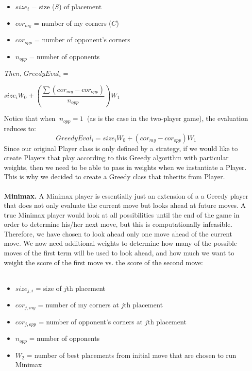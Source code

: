 \documentclass[11pt]{article}
\begin{document}
\begin{itemize}
\item $ size_i $ = size ($S$) of placement
\item $ cor_{my} $ = number of my corners ($C$)
\item $ cor_{opp} $ = number of opponent's corners
\item $ n_{opp} $ = number of opponents
\end{itemize}

{\it Then,} $ GreedyEval_i = $

\begin{center} $ size_i W_0 + \left ( \dfrac{\sum{(cor_{my} - cor_{opp})}}{n_{opp}} \right ) W_1 $ \end{center}

\bigskip

\noindent Notice that when $\ n_{opp} = 1 \ $ (as is the case in the two-player game), the evaluation reduces to:
$$ GreedyEval_i = size_i W_0 + (cor_{my} - cor_{opp}) W_1 $$
\noindent Since our original Player class is only defined by a strategy, if we would like to create Players that play according to this Greedy algorithm with particular weights, then we need to be able to pass in weights when we instantiate a Player. This is why we decided to create a Greedy class that inherits from Player.
\\\\
{\bf Minimax.} A Minimax player is essentially just an extension of a a Greedy player that does not only evaluate the current move but looks ahead at future moves. A true Minimax player would look at all possibilities until the end of the game in order to determine his/her next move, but this is computationally infeasible. Therefore, we have chosen to look ahead only one move ahead of the current move. We now need additional weights to determine how many of the possible moves of the first term will be used to look ahead, and how much we want to weight the score of the first move vs. the score of the second move:
\\\\

\begin{itemize}
\item $ size_{j,i} $ = size of $j$th placement
\item $ cor_{j,my} $ = number of my corners at $j$th placement
\item $ cor_{j,opp} $ = number of opponent's corners at $j$th placement
\item $ n_{opp} $ = number of opponents
\item $ W_2 $ = number of best placements from initial move that are chosen to run Minimax
\end{itemize}
\end{document}
